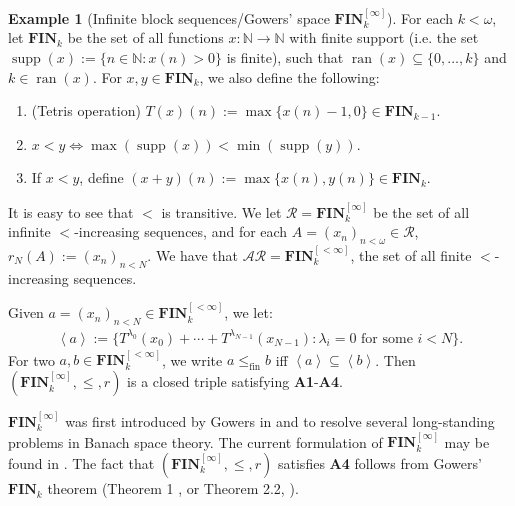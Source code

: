 \documentclass[11pt,reqno]{amsart}
\theoremstyle{plain}
\numberwithin{equation}{section}
\theoremstyle{definition}
\newtheorem{example}[theorem]{Example}
\newcommand{\func}{\operatorname}
\renewcommand{\c}[1]{\left\langle #1 \right\rangle}
\newcommand{\N}{\mathbb{N}}
\newcommand{\cal}{\mathcal}
\renewcommand{\bf}{\mathbf}
\newcommand{\supp}{\func{supp}}
\newcommand{\ran}{\func{ran}}
\newcommand{\FIN}{\bf{FIN}}
\newcommand{\fin}{\mathrm{fin}}
\begin{document}
\begin{example}[Infinite block sequences/Gowers' space $\FIN_k^{[\infty]}$]
\label{ex:gowers.FIN_k}
    For each $k < \omega$, let $\FIN_k$ be the set of all functions $x : \N \to \N$ with finite support (i.e. the set $\supp(x) := \{n \in \N : x(n) > 0\}$ is finite), such that $\ran(x) \subseteq \{0,\dots,k\}$ and $k \in \ran(x)$. For $x,y \in \FIN_k$, we also define the following:
    \begin{enumerate}
        \item (Tetris operation) $T(x)(n) := \max\{x(n) - 1,0\} \in \FIN_{k-1}$.

        \item $x < y \iff \max(\supp(x)) < \min(\supp(y))$.

        \item If $x < y$, define $(x + y)(n) := \max\{x(n),y(n)\} \in \FIN_k$.
    \end{enumerate}
    It is easy to see that $<$ is transitive. We let $\cal{R} = \FIN_k^{[\infty]}$ be the set of all infinite $<$-increasing sequences, and for each $A = (x_n)_{n<\omega} \in \cal{R}$, $r_N(A) := (x_n)_{n<N}$. We have that $\cal{AR} = \FIN_k^{[<\infty]}$, the set of all finite $<$-increasing sequences.
    
    Given $a = (x_n)_{n<N} \in \FIN_k^{[<\infty]}$, we let:
    \begin{align*}
        \c{a} := \{T^{\lambda_0}(x_0) + \cdots + T^{\lambda_{N-1}}(x_{N-1}) : \lambda_i = 0 \text{ for some } i < N\}.
    \end{align*}
    For two $a,b \in \FIN_k^{[<\infty]}$, we write $a \leq_\fin b$ iff $\c{a} \subseteq \c{b}$. Then $(\FIN_k^{[\infty]},\leq,r)$ is a closed triple satisfying \textbf{A1}-\textbf{A4}. 
    
    $\FIN_k^{[\infty]}$ was first introduced by Gowers in \cite{G92} and \cite{G02} to resolve several long-standing problems in Banach space theory. The current formulation of $\FIN_k^{[\infty]}$ may be found in \cite{T10}. The fact that $(\FIN_k^{[\infty]},\leq,r)$ satisfies \textbf{A4} follows from Gowers' $\FIN_k$ theorem (Theorem 1 \cite{G92}, or Theorem 2.2, \cite{T10}).
\end{example}
\end{document}
